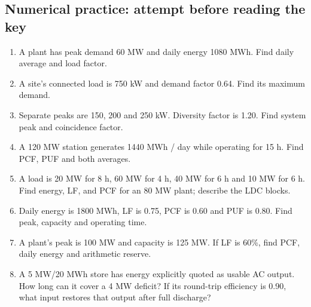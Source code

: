 \documentclass[11pt,a4paper]{article}
\begin{document}
\subsection{Numerical practice: attempt before reading the key}
\begin{enumerate}[label=\textbf{N\arabic*.}]
\item A plant has peak demand 60 MW and daily energy 1080 MWh. Find daily average and load factor.
\item A site's connected load is 750 kW and demand factor 0.64. Find its maximum demand.
\item Separate peaks are 150, 200 and 250 kW. Diversity factor is 1.20. Find system peak and coincidence factor.
\item A 120 MW station generates 1440 MWh / day while operating for 15 h. Find PCF, PUF and both averages.
\item A load is 20 MW for 8 h, 60 MW for 4 h, 40 MW for 6 h and 10 MW for 6 h. Find energy, LF, and PCF for an 80 MW plant; describe the LDC blocks.
\item Daily energy is 1800 MWh, LF is 0.75, PCF is 0.60 and PUF is 0.80. Find peak, capacity and operating time.
\item A plant's peak is 100 MW and capacity is 125 MW. If LF is 60\%, find PCF, daily energy and arithmetic reserve.
\item A 5 MW/20 MWh store has energy explicitly quoted as usable AC output. How long can it cover a 4 MW deficit? If its round-trip efficiency is 0.90, what input restores that output after full discharge?
\end{enumerate}
\end{document}
